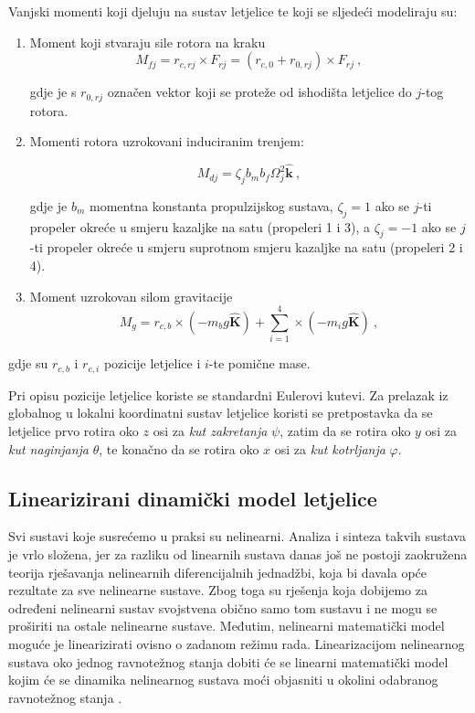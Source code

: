 \documentclass[11pt,a4paper]{article}
\begin{document}
Vanjski momenti koji djeluju na sustav letjelice te koji se sljedeći modeliraju su:
\begin{enumerate}
\item Moment koji stvaraju sile rotora na kraku
\begin{equation}
M_{fj} = r_{c,rj} \times F_{rj} = (r_{c,0} + r_{0,rj}) \times F_{rj} \ ,
\label{eq:Mfj}
\end{equation}

gdje je s $r_{0,rj}$ označen vektor koji se proteže od ishodišta letjelice do $j$-tog rotora.

\item Momenti rotora uzrokovani induciranim trenjem:

\begin{equation}
M_{dj} = \zeta_{j}b_{m}b_{f}\Omega_{j}^{2} \bm{\hat{k}} \ ,
\label{eq:Mdj}
\end{equation}

gdje je $b_{m}$ momentna konstanta propulzijskog sustava, $\zeta_{j} =  1$ ako se $j$-ti propeler okreće u smjeru kazaljke na satu (propeleri 1 i 3), a $\zeta_{j} =  -1$ ako se $j$-ti propeler okreće u smjeru suprotnom smjeru kazaljke na satu (propeleri 2 i 4).

\item Moment uzrokovan silom gravitacije
\begin{equation}
M_{g} = r_{c,b} \times (-m_{b}g \bm{\hat{K}}) + \sum_{i=1}^{4} \times (-m_{i}g \bm{\hat{K}}) \ ,
\label{eq:Mg}
\end{equation}
\end{enumerate}

gdje su $r_{c,b}$ i $r_{c,i}$ pozicije letjelice i $i$-te pomične mase.

Pri opisu pozicije letjelice koriste se standardni Eulerovi kutevi. Za prelazak iz globalnog u lokalni koordinatni sustav letjelice koristi se pretpostavka da se letjelice prvo rotira oko $z$ osi za \textit{kut zakretanja} $\psi$, zatim da se rotira oko $y$ osi za \textit{kut naginjanja} $\theta$, te konačno da se rotira oko $x$ osi za \textit{kut kotrljanja} $\varphi$.



\subsection{Linearizirani dinamički model letjelice}

Svi sustavi koje susrećemo u praksi su nelinearni. Analiza i sinteza takvih sustava je vrlo složena, jer za razliku od linearnih sustava danas još ne postoji zaokružena teorija rješavanja nelinearnih diferencijalnih jednadžbi, koja bi davala opće rezultate za sve nelinearne sustave. Zbog toga su rješenja koja dobijemo za određeni nelinearni sustav svojstvena obično samo tom sustavu i ne mogu se proširiti na ostale nelinearne sustave. Međutim, nelinearni matematički model moguće je linearizirati ovisno o zadanom režimu rada. Linearizacijom nelinearnog sustava oko jednog ravnotežnog stanja dobiti će se linearni matematički model kojim će se dinamika nelinearnog sustava moći objasniti u okolini odabranog ravnotežnog stanja \cite{vukic}.
\end{document}
